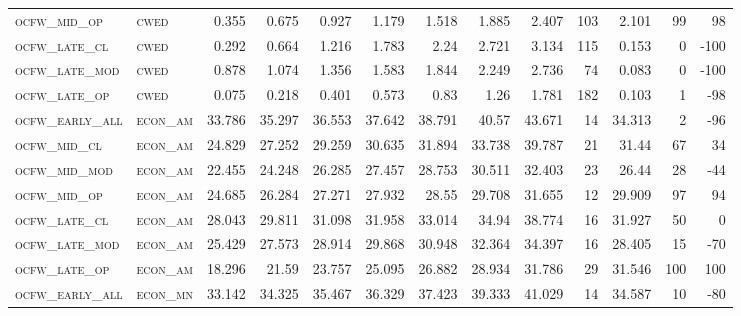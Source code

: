 \begin{landscape}
\begin{center}
\begin{footnotesize}
\begin{longtable}{llrrrrrrrr|rrr}
\textsc{ocfw\_mid\_op   } & \textsc{cwed      }   & 0.355    & 0.675    & 0.927    & 1.179    & 1.518    & 1.885    & 2.407    & 103    & 2.101         & 99            & 98              \\
\textsc{ocfw\_late\_cl  } & \textsc{cwed      }   & 0.292    & 0.664    & 1.216    & 1.783    & 2.24     & 2.721    & 3.134    & 115    & 0.153         & 0             & -100            \\
\textsc{ocfw\_late\_mod } & \textsc{cwed      }   & 0.878    & 1.074    & 1.356    & 1.583    & 1.844    & 2.249    & 2.736    & 74     & 0.083         & 0             & -100            \\
\textsc{ocfw\_late\_op  } & \textsc{cwed      }   & 0.075    & 0.218    & 0.401    & 0.573    & 0.83     & 1.26     & 1.781    & 182    & 0.103         & 1             & -98             \\
\textsc{ocfw\_early\_all} & \textsc{econ\_am  }   & 33.786   & 35.297   & 36.553   & 37.642   & 38.791   & 40.57    & 43.671   & 14     & 34.313        & 2             & -96             \\
\textsc{ocfw\_mid\_cl   } & \textsc{econ\_am  }   & 24.829   & 27.252   & 29.259   & 30.635   & 31.894   & 33.738   & 39.787   & 21     & 31.44         & 67            & 34              \\
\textsc{ocfw\_mid\_mod  } & \textsc{econ\_am  }   & 22.455   & 24.248   & 26.285   & 27.457   & 28.753   & 30.511   & 32.403   & 23     & 26.44         & 28            & -44             \\
\textsc{ocfw\_mid\_op   } & \textsc{econ\_am  }   & 24.685   & 26.284   & 27.271   & 27.932   & 28.55    & 29.708   & 31.655   & 12     & 29.909        & 97            & 94              \\
\textsc{ocfw\_late\_cl  } & \textsc{econ\_am  }   & 28.043   & 29.811   & 31.098   & 31.958   & 33.014   & 34.94    & 38.774   & 16     & 31.927        & 50            & 0               \\
\textsc{ocfw\_late\_mod } & \textsc{econ\_am  }   & 25.429   & 27.573   & 28.914   & 29.868   & 30.948   & 32.364   & 34.397   & 16     & 28.405        & 15            & -70             \\
\textsc{ocfw\_late\_op  } & \textsc{econ\_am  }   & 18.296   & 21.59    & 23.757   & 25.095   & 26.882   & 28.934   & 31.786   & 29     & 31.546        & 100           & 100             \\
\textsc{ocfw\_early\_all} & \textsc{econ\_mn  }   & 33.142   & 34.325   & 35.467   & 36.329   & 37.423   & 39.333   & 41.029   & 14     & 34.587        & 10            & -80             \\

\end{longtable}
\end{footnotesize}
\end{center}
\end{landscape}

